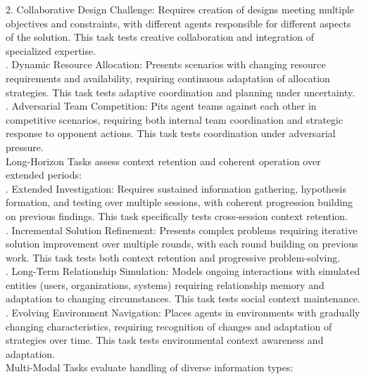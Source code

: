 2. Collaborative Design Challenge: Requires creation of designs meeting multiple objectives and constraints, with different agents responsible for different aspects of the solution. This task tests creative collaboration and integration of specialized expertise.\\ . Dynamic Resource Allocation: Presents scenarios with changing resource requirements and availability, requiring continuous adaptation of allocation strategies. This task tests adaptive coordination and planning under uncertainty.\\ . Adversarial Team Competition: Pits agent teams against each other in competitive scenarios, requiring both internal team coordination and strategic response to opponent actions. This task tests coordination under adversarial pressure.\\ \newline
Long-Horizon Tasks assess context retention and coherent operation over extended periods:\\ . Extended Investigation: Requires sustained information gathering, hypothesis formation, and testing over multiple sessions, with coherent progression building on previous findings. This task specifically tests cross-session context retention.\\ . Incremental Solution Refinement: Presents complex problems requiring iterative solution improvement over multiple rounds, with each round building on previous work. This task tests both context retention and progressive problem-solving.\\ . Long-Term Relationship Simulation: Models ongoing interactions with simulated entities (users, organizations, systems) requiring relationship memory and adaptation to changing circumstances. This task tests social context maintenance.\\ . Evolving Environment Navigation: Places agents in environments with gradually changing characteristics, requiring recognition of changes and adaptation of strategies over time. This task tests environmental context awareness and adaptation.\\ \newline
Multi-Modal Tasks evaluate handling of diverse information types:\\ \newline
